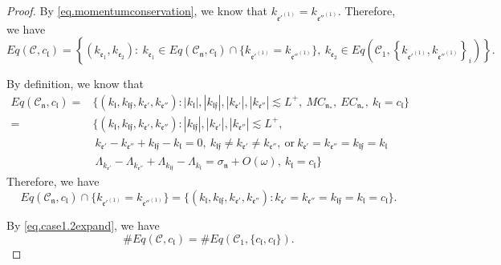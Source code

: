 \begin{proof}
    By \eqref{eq.momentumconservation}, we know that $k_{\mathfrak{e}'^{(1)}}=k_{\mathfrak{e}''^{(1)}}$. Therefore, we have 
    \begin{equation}\label{eq.case1.2expand}
     Eq(\mathcal{C},c_{\mathfrak{l}})=\left\{(k_{\mathfrak{e}_1},k_{\mathfrak{e}_{2}}):\ k_{\mathfrak{e}_1}\in Eq(\mathcal{C}_{\mathfrak{n}},c_{\mathfrak{l}})\cap \{k_{\mathfrak{e}'^{(1)}}=k_{\mathfrak{e}''^{(1)}}\},\  k_{\mathfrak{e}_{2}}\in Eq\left(\mathcal{C}_1, \left\{k_{\mathfrak{e}'^{(1)}}, k_{\mathfrak{e}''^{(1)}}\right\}_{i}\right)\right\}.
    \end{equation}
    
    By definition, we know that 
    \begin{equation}
    \begin{split}
     Eq(\mathcal{C}_{\mathfrak{n}},c_{\mathfrak{l}})=&\{(k_{\mathfrak{l}}, k_{\mathfrak{l}\mathfrak{f}}, k_{\mathfrak{e}'}, k_{\mathfrak{e}''}): |k_{\mathfrak{l}}|, |k_{\mathfrak{l}\mathfrak{f}}|, |k_{\mathfrak{e}'}|, |k_{\mathfrak{e}''}| \lesssim L^+,\ MC_{\mathfrak{n}_*},\  EC_{\mathfrak{n}_*},\ k_{\mathfrak{l}}=c_{\mathfrak{l}}\}
     \\
     =&\{(k_{\mathfrak{l}}, k_{\mathfrak{l}\mathfrak{f}}, k_{\mathfrak{e}'}, k_{\mathfrak{e}''}): |k_{\mathfrak{l}\mathfrak{f}}|, |k_{\mathfrak{e}'}|, |k_{\mathfrak{e}''}| \lesssim L^+,
     \\
     &\ k_{\mathfrak{e}'}-k_{\mathfrak{e}''}+k_{\mathfrak{l}\mathfrak{f}}-k_{\mathfrak{l}}=0,\ k_{\mathfrak{l}\mathfrak{f}}\ne k_{\mathfrak{e}'}\ne k_{\mathfrak{e}''},\ \text{or}\ k_{\mathfrak{e}'}= k_{\mathfrak{e}''}=k_{\mathfrak{l}\mathfrak{f}}=k_{\mathfrak{l}}
     \\
     &\  \Lambda_{k_{\mathfrak{e}'}}-\Lambda_{k_{\mathfrak{e}''}}+\Lambda_{k_{\mathfrak{l}\mathfrak{f}}}-\Lambda_{k_{\mathfrak{l}}} =\sigma_{\mathfrak{n}}+O(\omega),\ k_{\mathfrak{l}}=c_{\mathfrak{l}}\}
    \end{split}
    \end{equation}
    Therefore, we have
    \begin{equation}
     Eq(\mathcal{C}_{\mathfrak{n}},c_{\mathfrak{l}})\cap \{k_{\mathfrak{e}'^{(1)}}=k_{\mathfrak{e}''^{(1)}}\}=\{(k_{\mathfrak{l}}, k_{\mathfrak{l}\mathfrak{f}}, k_{\mathfrak{e}'}, k_{\mathfrak{e}''}):k_{\mathfrak{e}'}=k_{\mathfrak{e}''}=k_{\mathfrak{l}\mathfrak{f}}=k_{\mathfrak{l}}=c_{\mathfrak{l}}\}.
    \end{equation}
    
    By \eqref{eq.case1.2expand}, we have
    \begin{equation}
     \#Eq(\mathcal{C},c_{\mathfrak{l}})=\#Eq(\mathcal{C}_1, \{c_{\mathfrak{l}}, c_{\mathfrak{l}}\}).
    \end{equation}
    

\end{proof}

